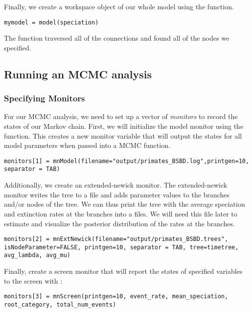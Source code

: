 Finally, we create a workspace object of our whole model using the  function. 
{\tt \begin{snugshade*}
\begin{lstlisting}
mymodel = model(speciation)
\end{lstlisting}
\end{snugshade*}}

The  function traversed all of the connections and found all of the nodes we specified. 


\subsection{Running an MCMC analysis}

\subsubsection{Specifying Monitors}

For our MCMC analysis, we need to set up a vector of \textit{monitors} to record the states of our Markov chain. 
First, we will initialize the model monitor using the  function. This creates a new monitor variable that will output the states for all model parameters when passed into a MCMC function. 
{\tt \begin{snugshade*}
\begin{lstlisting}
monitors[1] = mnModel(filename="output/primates_BSBD.log",printgen=10, separator = TAB)
\end{lstlisting}
\end{snugshade*}}

Additionally, we create an extended-newick monitor.
The extended-newick monitor writes the tree to a file and adds parameter values to the branches and/or nodes of the tree.
We can thus print the tree with the average speciation and extinction rates at the branches into a files.
We will need this file later to estimate and visualize the posterior distribution of the rates at the branches.
{\tt \begin{snugshade*}
\begin{lstlisting}
monitors[2] = mnExtNewick(filename="output/primates_BSBD.trees", isNodeParameter=FALSE, printgen=10, separator = TAB, tree=timetree, avg_lambda, avg_mu)
\end{lstlisting}
\end{snugshade*}}

Finally, create a screen monitor that will report the states of specified variables to the screen with :
{\tt \begin{snugshade*}
\begin{lstlisting}
monitors[3] = mnScreen(printgen=10, event_rate, mean_speciation, root_category, total_num_events)
\end{lstlisting}
\end{snugshade*}}

